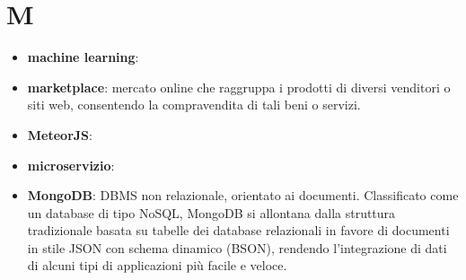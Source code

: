 \section{M}
\begin{itemize} 
	\item \textbf{machine learning}:
	\item \textbf{marketplace}: mercato online che raggruppa i prodotti di diversi venditori o siti web, consentendo la compravendita di tali beni o servizi.
	\item \textbf{MeteorJS}:
	\item \textbf{microservizio}:
	\item \textbf{MongoDB}: DBMS non relazionale, orientato ai documenti. Classificato come un database di tipo NoSQL, MongoDB si allontana dalla struttura tradizionale basata su tabelle dei database relazionali in favore di documenti in stile JSON con schema dinamico (BSON), rendendo l'integrazione di dati di alcuni tipi di applicazioni più facile e veloce. 
\end{itemize}
